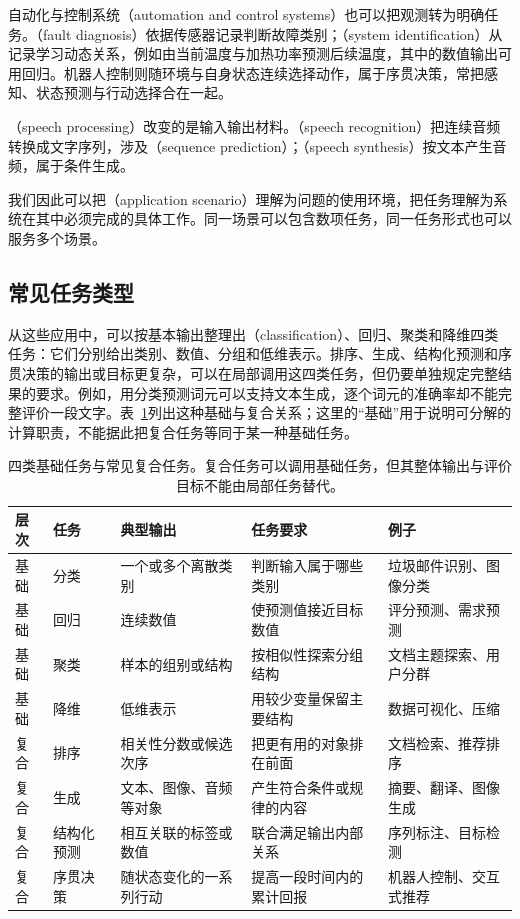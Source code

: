 自动化与控制系统（automation and control systems）也可以把观测转为明确任务。（fault diagnosis）依据传感器记录判断故障类别；（system identification）从记录学习动态关系，例如由当前温度与加热功率预测后续温度，其中的数值输出可用回归。机器人控制则随环境与自身状态连续选择动作，属于序贯决策，常把感知、状态预测与行动选择合在一起。

（speech processing）改变的是输入输出材料。（speech recognition）把连续音频转换成文字序列，涉及（sequence prediction）；（speech synthesis）按文本产生音频，属于条件生成。

我们因此可以把（application scenario）理解为问题的使用环境，把任务理解为系统在其中必须完成的具体工作。同一场景可以包含数项任务，同一任务形式也可以服务多个场景。

\subsection{常见任务类型}

从这些应用中，可以按基本输出整理出（classification）、回归、聚类和降维四类任务：它们分别给出类别、数值、分组和低维表示。排序、生成、结构化预测和序贯决策的输出或目标更复杂，可以在局部调用这四类任务，但仍要单独规定完整结果的要求。例如，用分类预测词元可以支持文本生成，逐个词元的准确率却不能完整评价一段文字。表~\ref{tab:common-ml-tasks}列出这种基础与复合关系；这里的“基础”用于说明可分解的计算职责，不能据此把复合任务等同于某一种基础任务。

\begin{table}[t]
  \centering
  \small
  \begin{tabularx}{\linewidth}{@{}llXXX@{}}
    \toprule
    \textbf{层次} & \textbf{任务} & \textbf{典型输出} & \textbf{任务要求} & \textbf{例子} \\
    \midrule
    基础 & 分类 & 一个或多个离散类别 & 判断输入属于哪些类别 & 垃圾邮件识别、图像分类 \\
    基础 & 回归 & 连续数值 & 使预测值接近目标数值 & 评分预测、需求预测 \\
    基础 & 聚类 & 样本的组别或结构 & 按相似性探索分组结构 & 文档主题探索、用户分群 \\
    基础 & 降维 & 低维表示 & 用较少变量保留主要结构 & 数据可视化、压缩 \\
    复合 & 排序 & 相关性分数或候选次序 & 把更有用的对象排在前面 & 文档检索、推荐排序 \\
    复合 & 生成 & 文本、图像、音频等对象 & 产生符合条件或规律的内容 & 摘要、翻译、图像生成 \\
    复合 & 结构化预测 & 相互关联的标签或数值 & 联合满足输出内部关系 & 序列标注、目标检测 \\
    复合 & 序贯决策 & 随状态变化的一系列行动 & 提高一段时间内的累计回报 & 机器人控制、交互式推荐 \\
    \bottomrule
  \end{tabularx}
  \caption{四类基础任务与常见复合任务。复合任务可以调用基础任务，但其整体输出与评价目标不能由局部任务替代。}
  \label{tab:common-ml-tasks}
\end{table}

